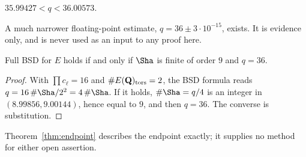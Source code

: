 \begin{theorem}\label{thm:qint}
$35.99427<q<36.00573$.
\end{theorem}
A much narrower floating-point estimate, $q=36\pm3\cdot10^{-15}$, exists. It is evidence only, and is never used as an input to any proof here.

\begin{theorem}\label{thm:endpoint}
Full BSD for $E$ holds if and only if $\Sha$ is finite of order $9$ and $q=36$.
\end{theorem}
\begin{proof}
With $\prod c_\ell=16$ and $\#E(\mathbf{Q})_{\mathrm{tors}}=2$, the BSD formula reads $q=16\,\#\Sha/2^2=4\,\#\Sha$. If it holds, $\#\Sha=q/4$ is an integer in $(8.99856,9.00144)$, hence equal to $9$, and then $q=36$. The converse is substitution.
\end{proof}
Theorem~\ref{thm:endpoint} describes the endpoint exactly; it supplies no method for either open assertion.
